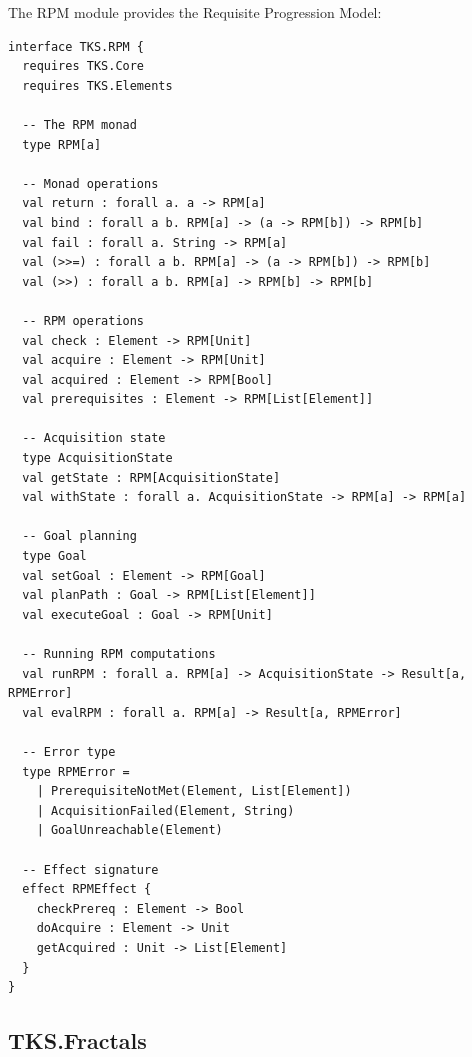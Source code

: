 \begin{definition}
\label{def:tks-rpm}
The RPM module provides the Requisite Progression Model:
\begin{verbatim}
interface TKS.RPM {
  requires TKS.Core
  requires TKS.Elements

  -- The RPM monad
  type RPM[a]

  -- Monad operations
  val return : forall a. a -> RPM[a]
  val bind : forall a b. RPM[a] -> (a -> RPM[b]) -> RPM[b]
  val fail : forall a. String -> RPM[a]
  val (>>=) : forall a b. RPM[a] -> (a -> RPM[b]) -> RPM[b]
  val (>>) : forall a b. RPM[a] -> RPM[b] -> RPM[b]

  -- RPM operations
  val check : Element -> RPM[Unit]
  val acquire : Element -> RPM[Unit]
  val acquired : Element -> RPM[Bool]
  val prerequisites : Element -> RPM[List[Element]]

  -- Acquisition state
  type AcquisitionState
  val getState : RPM[AcquisitionState]
  val withState : forall a. AcquisitionState -> RPM[a] -> RPM[a]

  -- Goal planning
  type Goal
  val setGoal : Element -> RPM[Goal]
  val planPath : Goal -> RPM[List[Element]]
  val executeGoal : Goal -> RPM[Unit]

  -- Running RPM computations
  val runRPM : forall a. RPM[a] -> AcquisitionState -> Result[a, RPMError]
  val evalRPM : forall a. RPM[a] -> Result[a, RPMError]

  -- Error type
  type RPMError =
    | PrerequisiteNotMet(Element, List[Element])
    | AcquisitionFailed(Element, String)
    | GoalUnreachable(Element)

  -- Effect signature
  effect RPMEffect {
    checkPrereq : Element -> Bool
    doAcquire : Element -> Unit
    getAcquired : Unit -> List[Element]
  }
}
\end{verbatim}
\end{definition}

\subsection{TKS.Fractals}
\label{subsec:tks-fractals}

